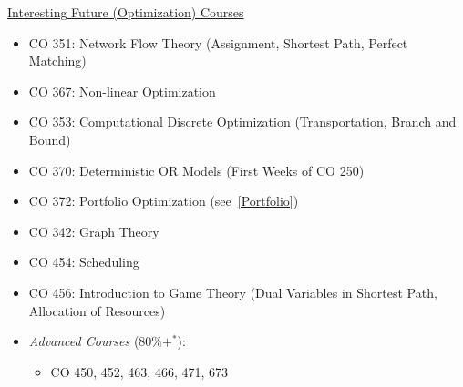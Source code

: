 \underline{Interesting Future (Optimization) Courses}
\begin{itemize}
    \item CO 351: Network Flow Theory (Assignment, Shortest Path, Perfect Matching)
    \item CO 367: Non-linear Optimization
    \item CO 353: Computational Discrete Optimization (Transportation, Branch and Bound)
    \item CO 370: Deterministic OR Models (First Weeks of CO 250)
    \item CO 372: Portfolio Optimization (see~\ref{Portfolio})
    \item CO 342: Graph Theory
    \item CO 454: Scheduling
    \item CO 456: Introduction to Game Theory (Dual Variables in Shortest Path, Allocation of Resources)
    \item \emph{Advanced Courses} ($ 80\%+^* $):
          \begin{itemize}
              \item CO 450, 452, 463, 466, 471, 673
          \end{itemize}
\end{itemize}
